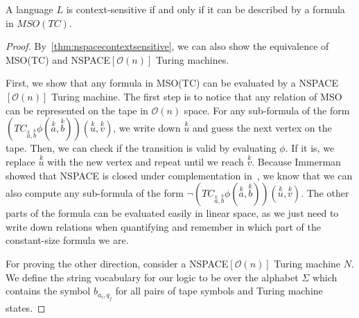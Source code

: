 \begin{theorem}
    \label{thm:contextsensitveMSOTC}
    A language $L$ is context-sensitive if and only if it can be described by a formula in $MSO(TC)$.
\end{theorem}

\begin{proof}
    By~\cref{thm:nspacecontextsensitive}, we can also show the equivalence of MSO(TC) and NSPACE$[\mathcal{O}(n)]$ Turing machines.

    First, we show that any formula in MSO(TC) can be evaluated by a NSPACE$[\mathcal{O}(n)]$ Turing machine.
    The first step is to notice that any relation of MSO can be represented on the tape in $\mathcal{O}(n)$ space.
    For any sub-formula of the form $\left(TC_{\overset{k}{a}, \overset{k}{b}}\phi\left(\overset{k}{a}, \overset{k}{b}\right)\right)\left(\overset{k}{u}, \overset{k}{v}\right)$, we write down $\overset{k}{u}$ and guess the next vertex on the tape.
    Then, we can check if the transition is valid by evaluating $\phi$.
    If it is, we replace $\overset{k}{u}$ with the new vertex and repeat until we reach $\overset{k}{v}$.
    Because Immerman showed that NSPACE is closed under complementation in~\cite{Immerman1988}, we know that we can also compute any sub-formula of the form $\neg\left(TC_{\overset{k}{a}, \overset{k}{b}}\phi\left(\overset{k}{a}, \overset{k}{b}\right)\right)\left(\overset{k}{u}, \overset{k}{v}\right)$.
    The other parts of the formula can be evaluated easily in linear space, as we just need to write down relations when quantifying and remember in which part of the constant-size formula we are.

    \vspace{5mm}

    For proving the other direction, consider a NSPACE$[\mathcal{O}(n)]$ Turing machine $N$.
    We define the string vocabulary for our logic to be over the alphabet $\Sigma$ which contains the symbol $b_{a_i, q_j}$ for all pairs of tape symbols and Turing machine states.


\end{proof}
